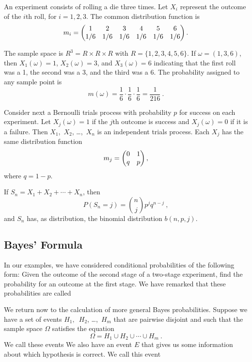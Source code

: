 \begin{example}\label{exam 5.6.1} An experiment consists of rolling a die three times.  Let
$X_i$ represent the outcome of the $i$th roll, for $i = 1, 2, 3$.  The common distribution
function is
$$ m_i = \begin{pmatrix} 1 & 2 & 3 & 4 & 5 & 6 \cr 1/6 & 1/6 & 1/6 & 1/6 & 1/6 & 1/6 \cr\end{pmatrix}.
$$

The sample space is $R^3 = R \times R \times R$ with $R = \{1,2,3,4,5,6\}$.  If
$\omega = (1,3,6)$, then $X_1(\omega) = 1$, $X_2(\omega) = 3$, and
$X_3(\omega) = 6$ indicating that the first roll was a 1, the second was a 3, and the third
was a 6.  The probability assigned to any sample point is
$$ m(\omega) = \frac16 \cdot \frac16 \cdot \frac16 = \frac1{216}\ .
$$
\end{example}

\begin{example}\label{exam 5.7} Consider next a Bernoulli trials process with probability $p$
for success on each experiment.  Let $X_j(\omega) = 1$ if the $j$th outcome is success and
$X_j(\omega) = 0$ if it is a failure.  Then $X_1$,~$X_2$, \dots,~$X_n$ is an independent
trials process.  Each $X_j$ has the same distribution function
$$ m_j = \begin{pmatrix} 0 & 1 \cr q & p  \cr\end{pmatrix},
$$ where $q = 1 - p$.

If $S_n = X_1 + X_2 +\cdots + X_n$, then
$$ P(S_n = j) = {n \choose j} p^{j} q^{n - j}\ ,  
$$ and $S_n$ has, as distribution, the binomial distribution $b(n,p,j)$.
\end{example}

\subsection*{Bayes' Formula}     

In our examples, we have considered conditional probabilities of the following
form: Given the outcome of the second stage of a two-stage experiment, find the
probability for an outcome at the first stage.  We have remarked that these
probabilities are called 

We return now to the calculation of more general Bayes probabilities.  Suppose
we have a set of events $H_1,$~$H_2$, \dots,~$H_m$ that are pairwise disjoint
and such that the sample space $\Omega$ satisfies the equation
$$
\Omega = H_1 \cup H_2 \cup\cdots\cup H_m\ .
$$
We call these events   We also have an event $E$ that gives us
some information about which hypothesis is correct.  We call this event 

